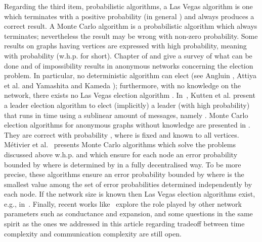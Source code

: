 \documentclass[11pt,envcountsame,letterpaper]{llncs}
\begin{document}
Regarding the third item, probabilistic algorithms, a Las Vegas algorithm is one which terminates
with a positive probability (in general ) and always produces
 a correct result.
A Monte Carlo algorithm is a probabilistic algorithm which always
terminates; nevertheless the result may be wrong with non-zero
probability.
Some results on graphs having
 vertices are expressed with high probability,
meaning with probability  (w.h.p. for short).
Chapter  of \cite{Tel} and \cite{lavault}
give a survey of what can be done and of
impossibility results in anonymous networks concerning the election problem.
  In particular, no
deterministic algorithm can elect (see Angluin \cite{Angluin}, Attiya
et al. \cite{ASW} and Yamashita and Kameda \cite{YK88}); furthermore,
with no knowledge on the network, there exists no Las Vegas election
algorithm \cite{IR90}. 
In~\cite{KuPPRT15}, Kutten et al. present a leader election algorithm to elect (implicitly) a leader (with high probability) that runs in  time using a sublinear amount of messages, namely .
Monte Carlo election algorithms for anonymous
graphs without knowledge are presented in \cite{IR90,AM94,SS94}.
They are correct
with probability , where  is fixed
and known to all vertices. M{\'e}tivier et al.~\cite{MRZ15} presents
 Monte Carlo algorithms
which solve the problems discussed above w.h.p. 
 and which ensure for each node  
an error probability bounded by  where  is
determined by  in a fully decentralised way. To be more precise,
these 
algorithms ensure an error probability bounded by 
where  
is the smallest value among the set of error probabilities
determined  independently by each node.
If the network size is known then Las Vegas election algorithms exist, e.g., in~\cite{IR90}.
Finally, recent works like~\cite{GRS18} explore the role played by other network parameters such as conductance and expansion, and some questions in the same spirit as the ones we addressed in this article regarding tradeoff between time complexity and communication complexity are still open.
\end{document}
